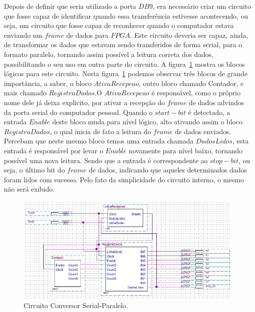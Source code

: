 \documentclass[12pt]{article}
\begin{document}
Depois de definir que seria utilizado a porta $DB9$, era necessário criar um circuito que fosse capaz de identificar quando essa transferência estivesse acontecendo, ou seja, um circuito que fosse capaz de reconhecer quando o computador estava enviando um $frame$ de dados para $FPGA$. Este circuito deveria ser capaz, ainda, de transformar os dados que estavam sendo transferidos de forma serial, para o formato paralelo, tornando assim possível a leitura correta dos dados, possibilitando o seu uso em outra parte do circuito. A figura~\ref{fig:aa2} mostra os blocos lógicos para este circuito. Nesta figura~\ref{fig:aa2} podemos observar três blocos de grande importância, a saber, o bloco $AtivaRecepcao$, outro bloco chamado Contador, e mais chamado $RegistraDados$.O $AtivaRecepcao$ é responsável, como o próprio nome dele já deixa explicito, por ativar a recepção do $frame$ de dados advindos da porta serial do computador pessoal. Quando o $start-bit$ é detectado, a entrada $Enable$ deste bloco muda para nível lógico, alto ativando assim o bloco $RegistraDados$, o qual inicia de fato a leitura do $frame$ de dados enviados. Percebam que neste mesmo bloco temos uma entrada chamada $DadosLidos$, esta entrada é responsável por levar o $Enable$ novamente para nível baixo, tornando possível uma nova leitura. Sendo que a entrada é correspondente ao $stop-bit$, ou seja, o último bit do $frame$ de dados, indicando que aqueles determinados dados foram lidos com sucesso. Pelo fato da simplicidade do circuito interno, o mesmo não será exibido. 


\begin{figure}[h]
\centering
\includegraphics[width=1\textwidth]{img/aa2.jpg}
\caption{Circuito Conversor Serial-Paralelo.}
\label{fig:aa2}
\end{figure}
\end{document}
